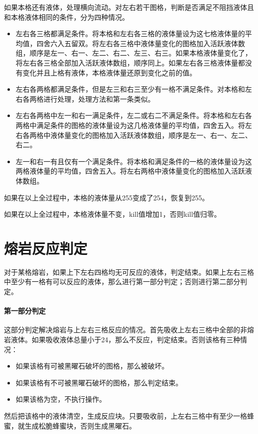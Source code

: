如果本格还有液体，处理横向流动。对左右若干图格，判断是否满足不阻挡液体且和本格液体相同的条件，分为四种情况。
\begin{itemize}
    \item 左右各三格都满足条件。将本格和左右各三格的液体量设为这七格液体量的平均值，四舍六入五留双。将左右各三格中液体量变化的图格加入活跃液体数组，顺序是左一、右一、左二、右二、左三、右三。如果本格液体量变化了，将左右各三格全部加入活跃液体数组，顺序同上。如果左右各三格液体量都没有变化并且上格有液体，本格液体量还原到变化之前的值。
    \item 左右各两格都满足条件，但是左三和右三至少有一格不满足条件。对本格和左右各两格进行处理，处理方法和第一条类似。
    \item 左右各两格中左一和右一满足条件，左二或右二不满足条件。将本格和左右各两格中满足条件的图格的液体量设为这几格液体量的平均值，四舍五入。将左右各两格中液体量变化的图格加入活跃液体数组，顺序是左一、右一、左二、右二。
    \item 左一和右一有且仅有一个满足条件。将本格和满足条件的一格的液体量设为这两格液体量的平均值，四舍五入。将左右两格中液体量变化的图格加入活跃液体数组。
\end{itemize}

如果在以上全过程中，本格的液体量从255变成了254，恢复到255。

如果在以上全过程中，本格液体量不变，kill值增加1，否则kill值归零。

\section{熔岩反应判定}
对于某格熔岩，如果上下左右四格均无可反应的液体，判定结束。如果上左右三格中至少有一格有可以反应的液体，那么进行第一部分判定；否则进行第二部分判定。

\paragraph*{第一部分判定}
这部分判定解决熔岩与上左右三格反应的情况。首先吸收上左右三格中全部的非熔岩液体。如果吸收液体总量小于24，那么不反应，判定结束。否则该格有三种情况：
\begin{itemize}
    \item 如果该格有可被黑曜石破坏的图格，那么被破坏。
    \item 如果该格有不可被黑曜石破坏的图格，那么判定结束。
    \item 如果该格为空，不执行操作。
\end{itemize}
然后把该格中的液体清空，生成反应块。只要吸收前，上左右三格中有至少一格蜂蜜，就生成松脆蜂蜜块，否则生成黑曜石。


